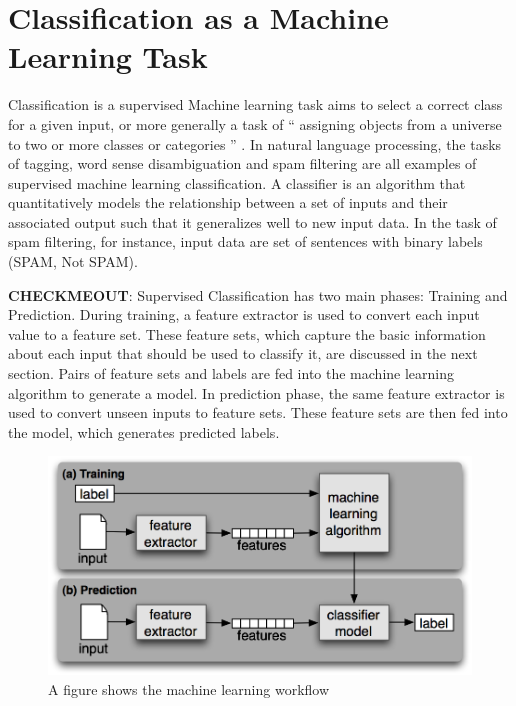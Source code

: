 \section{Classification as a Machine Learning Task}
Classification is a supervised Machine learning task aims to select a correct class for a given input, or more generally a task of “ assigning objects from a universe to two or more classes or categories ” \citep{manning1999foundations}. In natural language processing, the tasks of tagging, word sense disambiguation and spam filtering are all examples of supervised machine learning classification. A classifier is an algorithm that quantitatively models the relationship between a set of inputs and their associated output such that it generalizes well to new input data. In the task of spam filtering, for instance, input data are set of sentences with binary labels (SPAM, Not SPAM). 

\textbf{CHECKMEOUT}: Supervised Classification has two main phases: Training and Prediction. During training, a feature extractor is used to convert each input value to a feature set. These feature sets, which capture the basic information about each input that should be used to classify it, are discussed in the next section. Pairs of feature sets and labels are fed into the machine learning algorithm to generate a model. In prediction phase, the same feature extractor is used to convert unseen inputs to feature sets. These feature sets are then fed into the model, which generates predicted labels.

\begin{figure}
\includegraphics[scale=.8]{../Figures/mlpipeline.png} \centering
\caption{A figure shows the machine learning workflow}
\end{figure}

